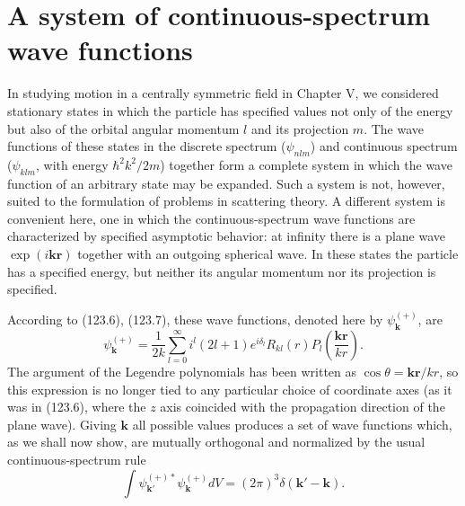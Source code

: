 \section{A system of continuous-spectrum wave functions}

In studying motion in a centrally symmetric field in Chapter V, we considered
stationary states in which the particle has specified values not only of the
energy but also of the orbital angular momentum $l$ and its projection $m$.
The wave functions of these states in the discrete spectrum ($\psi_{nlm}$)
and continuous spectrum ($\psi_{klm}$, with energy $\hbar^2k^2/2m$) together
form a complete system in which the wave function of an arbitrary state may
be expanded. Such a system is not, however, suited to the formulation of
problems in scattering theory. A different system is convenient here, one in
which the continuous-spectrum wave functions are characterized by specified
asymptotic behavior: at infinity there is a plane wave
$\exp(i\mathbf{kr})$ together with an outgoing spherical wave. In these
states the particle has a specified energy, but neither its angular momentum
nor its projection is specified.

According to (123.6), (123.7), these wave functions, denoted here by
$\psi_{\mathbf k}^{(+)}$, are
\begin{equation}
 \psi_{\mathbf k}^{(+)}=\frac1{2k}\sum_{l=0}^{\infty}i^l(2l+1)e^{i\delta_l}R_{kl}(r)
 P_l\left(\frac{\mathbf{kr}}{kr}\right).
 \tag{136.1}
\end{equation}
The argument of the Legendre polynomials has been written as
$\cos\theta=\mathbf{kr}/kr$, so this expression is no longer tied to any
particular choice of coordinate axes (as it was in (123.6), where the $z$
axis coincided with the propagation direction of the plane wave). Giving
$\mathbf k$ all possible values produces a set of wave functions which, as
we shall now show, are mutually orthogonal and normalized by the usual
continuous-spectrum rule
\begin{equation}
 \int\psi_{\mathbf k'}^{(+)*}\psi_{\mathbf k}^{(+)}dV=(2\pi)^3\delta(\mathbf k'-\mathbf k).
 \tag{136.2}
\end{equation}

